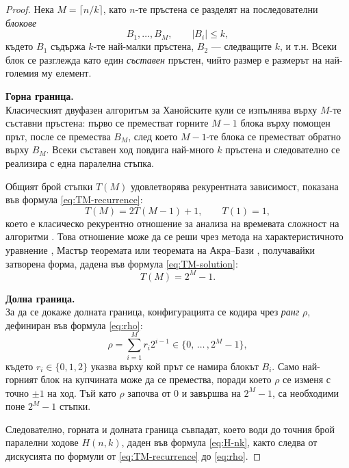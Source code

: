 \renewcommand{\proofname}{Доказателство}
\begin{proof}
	Нека $M=\lceil n/k\rceil$, като $n$-те пръстена се разделят на последователни \emph{блокове}
	\[
	B_1,\dots,B_M,\qquad |B_i|\le k,
	\]
	където $B_1$ съдържа $k$-те най-малки пръстена, $B_2$ — следващите $k$, и т.н.
	Всеки блок се разглежда като един \emph{съставен} пръстен, чийто размер е размерът на най-големия му елемент.
	
	\textbf{Горна граница.}\\
	Класическият двуфазен алгоритъм за Ханойските кули се изпълнява върху $M$-те съставни пръстена:
	първо се преместват горните $M-1$ блока върху помощен прът, после се премества $B_M$, след което
	$M-1$-те блока се преместват обратно върху $B_M$. Всеки съставен ход повдига най-много $k$ пръстена и следователно се реализира с една паралелна стъпка.
	
	Общият брой стъпки $T(M)$ удовлетворява рекурентната зависимост, показана във формула \eqref{eq:TM-recurrence}:
	\begin{equation}
		T(M) = 2 T(M-1) + 1, \qquad T(1) = 1,
		\label{eq:TM-recurrence}
	\end{equation}
	което е класическо рекурентно отношение за анализа на времевата сложност на алгоритми \cite{rosen2019, Graham1994}. Това отношение може да се реши чрез метода на характеристичното уравнение \cite{Manev2012}, Мастър теоремата \cite{CLRS_TowerOfHanoi} или теоремата на Акра–Бази \cite{akra1998,Sedgewick2011}, получавайки затворена форма, дадена във формула \eqref{eq:TM-solution}:
	\begin{equation}
		T(M) = 2^M - 1.
		\label{eq:TM-solution}
	\end{equation}
	
	\textbf{Долна граница.}\\
	За да се докаже долната граница, конфигурацията се кодира чрез \emph{ранг} $\rho$, дефиниран във формула \eqref{eq:rho}:
	\begin{equation}
		\rho = \sum_{i=1}^{M} r_i 2^{i-1} \in \{ 0, \, \dots \, , 2^M - 1 \},
		\label{eq:rho}
	\end{equation}
	където $r_i\in\{0,1,2\}$ указва върху кой прът се намира блокът $B_i$. Само най-горният блок на купчината може да се премества, поради което $\rho$ се изменя с точно $\pm 1$ на ход. Тъй като $\rho$ започва от $0$ и завършва на $2^M-1$, са необходими поне $2^M - 1$ стъпки.
	
	Следователно, горната и долната граница съвпадат, което води до точния брой паралелни ходове $H(n,k)$, даден във формула \eqref{eq:H-nk}, както следва от дискусията по формули от \eqref{eq:TM-recurrence} до \eqref{eq:rho}.
\end{proof}

